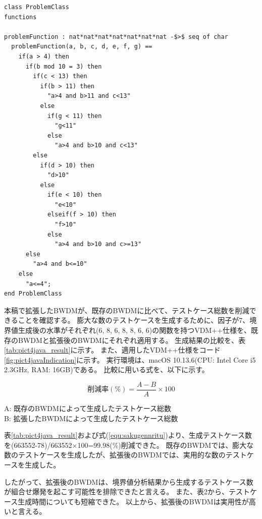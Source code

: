 \documentclass[uplatex, report, a4j, 10pt]{jsbook}
\begin{document}
\lstset{language=}
\noindent\begin{minipage}{\textwidth}
  \begin{lstlisting}[caption=因子が7、水準が(6 8 6 8 8 6 6)の関数を持つVDM++仕様,label=fig:pict4javaIndication]
class ProblemClass
functions

problemFunction : nat*nat*nat*nat*nat*nat*nat -$>$ seq of char
  problemFunction(a, b, c, d, e, f, g) ==
    if(a > 4) then
      if(b mod 10 = 3) then
        if(c < 13) then
          if(b > 11) then
            "a>4 and b>11 and c<13"
          else
            if(g < 11) then
              "g<11"
            else
              "a>4 and b>10 and c<13"
        else
          if(d > 10) then
            "d>10"
          else
            if(e < 10) then
              "e<10"
            elseif(f > 10) then
              "f>10"
            else
              "a>4 and b>10 and c>=13"
      else
        "a>4 and b<=10"
    else
      "a<=4";
end ProblemClass
\end{lstlisting}
\end{minipage}

本稿で拡張したBWDMが、既存のBWDMに比べて、テストケース総数を削減できることを確認する。
膨大な数のテストケースを生成するために、因子が7、境界値生成後の水準がそれぞれ(6, 8, 6, 8, 8, 6, 6)の関数を持つVDM++仕様を、既存のBWDMと拡張後のBWDMにそれぞれ適用する。
生成結果の比較を、表\ref{tab:pict4java_result}に示す。
また、適用したVDM++仕様をコード\ref{fig:pict4javaIndication}に示す。
実行環境は、macOS 10.13.6(CPU: Intel Core i5 2.3GHz, RAM: 16GB)である。
比較に用いる式を、以下に示す。

\begin{equation}\label{equ:sakugennritu}
  削減率(\%) = \frac{A - B}{A} \times 100
\end{equation}

\begin{center}
  A: 既存のBWDMによって生成したテストケース総数\\
  B: 拡張したBWDMによって生成したテストケース総数\\
\end{center}

表\ref{tab:pict4java_result}および式(\ref{equ:sakugennritu})より、生成テストケース数を(663552-78)/663552×100=99.98(\%)削減できた。
既存のBWDMでは、膨大な数のテストケースを生成したが、拡張後のBWDMでは、実用的な数のテストケースを生成した。

したがって、拡張後のBWDMは、境界値分析結果から生成するテストケース数が組合せ爆発を起こす可能性を排除できたと言える。
また、表2から、テストケース生成時間についても短縮できた。
以上から、拡張後のBWDMは実用性が高いと言える。
\end{document}
